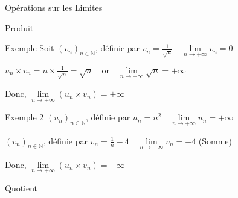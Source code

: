 \documentclass{cours}
\begin{document}
\begin{Gpartie}{Opérations sur les Limites}
\begin{Spartie}{Produit}
\begin{SSpartie}{Exemple}
                Soit $(v_n)_{n\in\mathbb{N}}$, définie par $v_n=\frac{1}{\sqrt{n}}\quad\lim\limits_{n\to +\infty}v_n=0$

                $u_n\times v_n=n\times\frac{1}{\sqrt{n}}=\sqrt{n}\quad\text{or}\quad\lim\limits_{n\to +\infty}\sqrt{n}=+\infty$

                Donc, $\lim\limits_{n\to +\infty}(u_n\times v_n)=+\infty$
            \end{SSpartie}
            \begin{SSpartie}{Exemple 2} 
                $(u_n)_{n\in\mathbb{N}}$, définie par $u_n=n^2\quad\lim\limits_{n\to +\infty}u_n=+\infty$

                $(v_n)_{n\in\mathbb{N}}$, définie par $v_n=\frac{1}{n}-4\quad\lim\limits_{n\to +\infty}v_n=-4$ (Somme)

                Donc, $\lim\limits_{n\to +\infty}(u_n\times v_n)=-\infty$
            \end{SSpartie}
        \end{Spartie}
        \begin{Spartie}{Quotient}
            \begin{center}
\end{center}
\end{Spartie}
\end{Gpartie}
\end{document}
